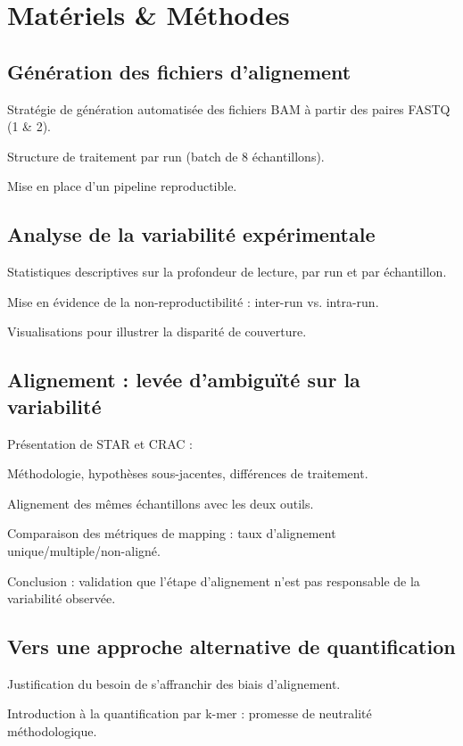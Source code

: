 \section{Matériels \& Méthodes}
\subsection{Génération des fichiers d’alignement}
    Stratégie de génération automatisée des fichiers BAM à partir des paires FASTQ (1 \& 2).
    
    Structure de traitement par run (batch de 8 échantillons).

    Mise en place d’un pipeline reproductible.
\subsection{Analyse de la variabilité expérimentale}

    Statistiques descriptives sur la profondeur de lecture, par run et par échantillon.

    Mise en évidence de la non-reproductibilité : inter-run vs. intra-run.

    Visualisations pour illustrer la disparité de couverture.

\subsection{Alignement : levée d’ambiguïté sur la variabilité}

    Présentation de STAR et CRAC :

        Méthodologie, hypothèses sous-jacentes, différences de traitement.

    Alignement des mêmes échantillons avec les deux outils.

    Comparaison des métriques de mapping : taux d’alignement unique/multiple/non-aligné.

    Conclusion : validation que l’étape d’alignement n’est pas responsable de la variabilité observée.

\subsection{Vers une approche alternative de quantification}

    Justification du besoin de s’affranchir des biais d’alignement.

    Introduction à la quantification par k-mer : promesse de neutralité méthodologique.

